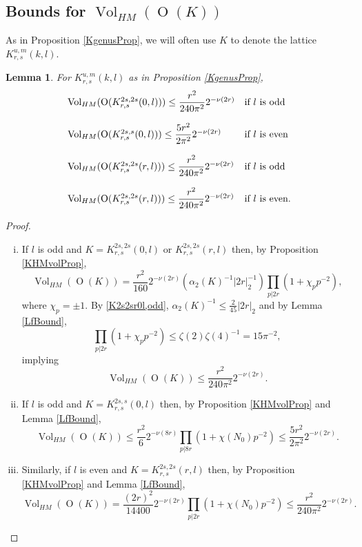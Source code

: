 \documentclass[12pt, a4paper]{article}
\newtheorem{lemma}[thm]{Lemma}
\newcommand{\opn}{\operatorname}
\begin{document}
\subsection{Bounds for $\opn{Vol}_{HM}(\opn{O}(K))$}
As in Proposition \ref{KgenusProp}, we will often use $K$ to denote the lattice $K_{r,s}^{u,m}(k,l)$.
\begin{lemma}\label{Kbound}
  For $K^{u,m}_{r,s}(k,l)$ as in Proposition \ref{KgenusProp}, 
\[
  \begin{array}{l l }
    \opn{Vol}_{HM}(\opn{O}(K^{2s, 2s}_{r,s}({0,l})))  \leq \dfrac{r^2 }{240 \pi^2} 2^{-\nu(2r)} & \text{if $l$ is odd} \\
    [15pt]\opn{Vol}_{HM}(\opn{O}(K^{2s, s}_{r,s}({0,l})))  \leq \dfrac{5r^2}{2 \pi^2}2^{-\nu(2r)} & \text{if $l$ is even}\\
    [15pt]
    \opn{Vol}_{HM}(\opn{O}(K^{2s, 2s}_{r,s}(r,l)))  \leq \dfrac{r^2 }{240 \pi^2} 2^{-\nu(2r)}  & \text{if $l$ is odd} \\
    [15pt]
    \opn{Vol}_{HM}(\opn{O}(K^{2s, 2s}_{r,s}(r,l)))  \leq \dfrac{r^2 }{240 \pi^2} 2^{-\nu(2r)} & \text{if $l$ is even.}
  \end{array}
  \]
\end{lemma}
\begin{proof}
  \begin{enumerate}[(i)]
    \item If $l$ is odd and $K = K^{2s, 2s}_{r,s}(0,l)$ or $K^{2s,2s}_{r,s}(r,l)$ then, by Proposition \ref{KHMvolProp},
  \begin{equation*}
    \opn{Vol}_{HM}(\opn{O}(K))
    =
    \frac{r^2}{160} 2^{-\nu(2r)}
    (\alpha_2(K)^{-1} \vert 2r \vert^{-1}_2)
    \prod_{p \vert 2r} ( 1+ \chi_p p^{-2}), 
  \end{equation*}
  where $\chi_p = \pm 1$.
  By \eqref{K2s2sr0l,odd}, 
$\alpha_2(K)^{-1} \leq \frac{2}{45} \vert 2r \vert_2$ and 
  by Lemma \ref{LfBound},
  \[
  \prod_{p \vert 2r} (1+ \chi_p p^{-2}) \leq \zeta(2) \zeta(4)^{-1} = 15 \pi^{-2}, 
  \] 
  implying 
  \[
    \opn{Vol}_{HM}(\opn{O}(K))
\leq \frac{r^2 }{240 \pi^2} 2^{-\nu(2r)}.
\]
\item  If $l$ is odd and $K=K^{2s,s}_{r,s}(0,l)$ then, by Proposition \ref{KHMvolProp} and Lemma \ref{LfBound},
  \begin{equation*}
    \opn{Vol}_{HM}(\opn{O}(K)) \leq
    \frac{r^2}{6} 2^{-\nu(8r)}\prod_{p \vert 8r} (1 + \chi(N_0)p^{-2}) \leq 
    \frac{5r^2}{2 \pi^2}2^{-\nu(2r)}.
  \end{equation*}
\item Similarly, if $l$ is even and $K = K^{2s, 2s}_{r,s}(r,l)$ then, by Proposition \ref{KHMvolProp} and Lemma \ref{LfBound}, 
  \[
    \opn{Vol}_{HM}(\opn{O}(K))
    =
    \frac{(2r)^2}{14400} 2^{-\nu(2r)}
    \prod_{p \vert 2r} (1 + \chi(N_0) p^{-2})
\leq
\frac{r^2}{240 \pi^2} 2^{-\nu(2r)}.
  \]
  \end{enumerate}
\end{proof}
\end{document}
